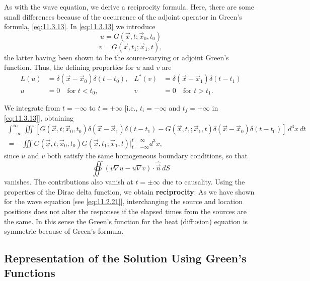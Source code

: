 As with the wave equation, we derive a reciprocity formula.  Here, there are some small differences because of the occurrence of the adjoint operator in Green's formula, \eqref{eq:11.3.13}.  In \eqref{eq:11.3.13} we introduce
\begin{equation}
\label{eq:11.3.18}
u = G(\vec{x},t;\vec{x}_0,t_0)
\end{equation}
\begin{equation}
\label{eq:11.3.19}
v = G(\vec{x},t_1;\vec{x}_1,t),
\end{equation}
the latter having been shown to be the source-varying or adjoint Green's function.  Thus, the defining properties for $u$ and $v$ are
\begin{align*}
L(u) &= \delta(\vec{x} - \vec{x}_0)\delta(t - t_0), & L^*(v) &= \delta(\vec{x} - \vec{x}_1)\delta(t - t_1) \\
u &= 0 \quad \text{for } t < t_0, & v &= 0 \quad \text{for } t > t_1.
\end{align*}

We integrate from $t = -\infty$ to $t = +\infty$ [i.e., $t_i = -\infty$ and $t_f = +\infty$ in \eqref{eq:11.3.13}], obtaining
\begin{multline*}
\int_{-\infty}^{\infty} \iiint [G(\vec{x},t;\vec{x}_0,t_0)\delta(\vec{x} - \vec{x}_1)\delta(t - t_1) - G(\vec{x},t_1;\vec{x}_1,t)\delta(\vec{x} - \vec{x}_0)\delta(t - t_0)]\,d^3x\,dt \\
= -\iiint G(\vec{x},t;\vec{x}_0,t_0)G(\vec{x},t_1;\vec{x}_1,t)\bigg|_{t=-\infty}^{t=\infty} d^3x,
\end{multline*}
since $u$ and $v$ both satisfy the same homogeneous boundary conditions, so that
\[
\oiint (v\nabla u - u\nabla v)\cdot\hat{\vec{n}}\,dS
\]
vanishes.  The contributions also vanish at $t = \pm\infty$ due to causality.  Using the properties of the Dirac delta function, we obtain \textbf{reciprocity}:
As we have shown for the wave equation [see \eqref{eq:11.2.21}], interchanging the source and location positions does not alter the responses if the elapsed times from the sources are the same.  In this sense the Green's function for the heat (diffusion) equation is symmetric because of Green's formula.

\subsection{Representation of the Solution Using Green's Functions}
\label{subsec:representation-heat}

